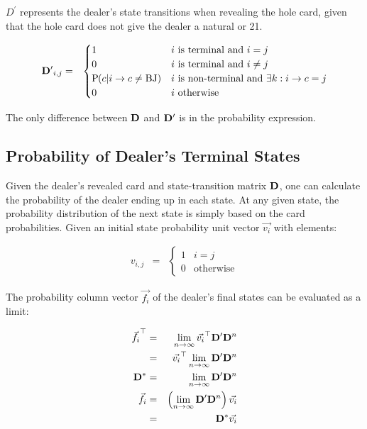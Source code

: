$D^\prime$ represents the dealer's state transitions
when revealing the hole card,
given that the hole card does not give the dealer a natural or 21.

\begin{eqnarray}
\mathbf{D^\prime}_{i,j} &=&
\begin{cases}
1 & i~\text{is terminal and } i=j \\
0 & i~\text{is terminal and } i\neq{}j \\
\textrm{P}\hspace{-.5ex}\left(c|i\rightarrow{}c\neq{}\text{BJ}\right) &
  i~\text{is non-terminal and } \exists k : i\rightarrow{}c = j \\
0 & i~\text{otherwise}
\end{cases}
\end{eqnarray}

\noindent
The only difference between $\mathbf{D}$ and $\mathbf{D^\prime}$
is in the probability expression.  

\subsection{Probability of Dealer's Terminal States}
\label{sec:rules:dealer-play:final-pdf}

Given the dealer's revealed card and state-transition matrix $\mathbf{D}$, 
one can calculate the probability of the dealer ending up in each state.
At any given state, the probability distribution of the
next state is simply based on the card probabilities.  
Given an initial state probability unit vector $\Vec{v_i}$ with elements:

\begin{eqnarray}
v_{i,j} &=& 
\begin{cases}
1 & i=j \\
0 & \text{otherwise}
\end{cases}
\end{eqnarray}

\noindent
The probability column vector $\Vec{f_i}$ of the dealer's final states 
can be evaluated as a limit:

\begin{eqnarray}
\vec{f_i}^{\top} &=& \lim_{n\rightarrow\infty}{\vec{v_i}^{\top}\mathbf{D^\prime}\mathbf{D}^n} \nonumber \\
&=& \vec{v_i}^{\top} \lim_{n\rightarrow\infty}{\mathbf{D^\prime}\mathbf{D}^n} \\
\mathbf{D^*} &=& \lim_{n\rightarrow\infty}{\mathbf{D^\prime}\mathbf{D}^n} \\
\vec{f_i} &=& \left(\lim_{n\rightarrow\infty}{\mathbf{D^\prime}\mathbf{D}^n}\right) \vec{v_i} \nonumber \\
&=& \mathbf{D^*} \vec{v_i}
\end{eqnarray}

